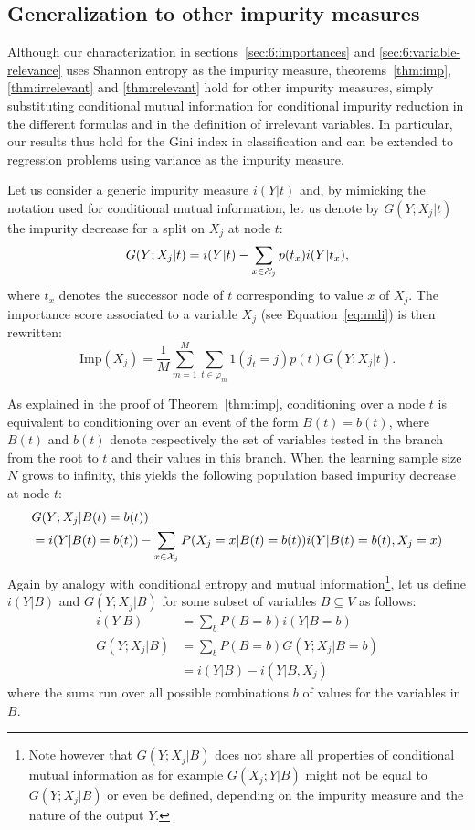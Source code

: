 \subsection{Generalization to other impurity measures}

Although our characterization in sections~\ref{sec:6:importances} and
\ref{sec:6:variable-relevance} uses Shannon entropy as the impurity measure,
theorems~\ref{thm:imp}, \ref{thm:irrelevant} and \ref{thm:relevant} hold for
other impurity measures, simply substituting conditional mutual information for
conditional impurity reduction in the different formulas and in the definition
of irrelevant variables.  In particular, our results thus hold for the Gini
index in classification and can be extended to regression problems using
variance as the impurity measure.

Let us consider a generic impurity measure $i(Y|t)$ and, by mimicking the
notation used for conditional mutual information, let us denote by $G(Y;X_j|t)$
the impurity decrease for a split on $X_j$ at node $t$:
\begin{equation}%
G(Y;X_j|t) = i(Y|t)-\sum_{x\in{\cal X}_j} p(t_x) i(Y|t_x),
\end{equation}
where $t_{x}$ denotes the successor node of $t$ corresponding to value
$x$ of $X_j$. The importance score associated to a variable $X_j$ (see
Equation~\ref{eq:mdi}) is then rewritten:
\begin{equation}\label{eq:mdigen}
\text{Imp}(X_j) = \frac{1}{M} \sum_{m=1}^M \sum_{t \in \varphi_m} 1(j_t = j) p(t) G(Y;X_j|t).
\end{equation}

As explained in the proof of Theorem~\ref{thm:imp}, conditioning
over a node $t$ is equivalent to conditioning over an event of the
form $B(t)=b(t)$, where $B(t)$ and $b(t)$ denote respectively the set
of variables tested in the branch from the root to $t$ and their
values in this branch. When the learning sample size $N$ grows to
infinity, this yields the following population based impurity decrease
at node $t$:
\begin{align}
&G(Y;X_j|B(t)=b(t)) \\
&=i(Y|B(t)=b(t))-\sum_{x\in{\cal X}_j} P(X_j=x|B(t)=b(t)) i(Y|B(t)=b(t),X_j=x) \nonumber \label{eqn:imppop}
\end{align}
Again by analogy with conditional entropy and mutual
information\footnote{Note however that $G(Y;X_j|B)$ does not share all
  properties of conditional mutual information as for example $G(X_j;
  Y|B)$ might not be equal to $G(Y; X_j|B)$ or even be defined,
  depending on the impurity measure and the nature of the output
  $Y$.}, let us define $i(Y|B)$ and $G(Y;X_j|B)$ for some subset of
variables $B\subseteq V$ as follows:
\begin{align}
i(Y|B)&=\sum_{b} P(B=b) i(Y|B=b)\\
G(Y;X_j|B)&= \sum_{b} P(B=b) G(Y;X_j|B=b)\\
&=i(Y|B)-i(Y|B,X_j) \nonumber
\end{align}
where the sums run over all possible combinations $b$ of values for
the variables in $B$.

